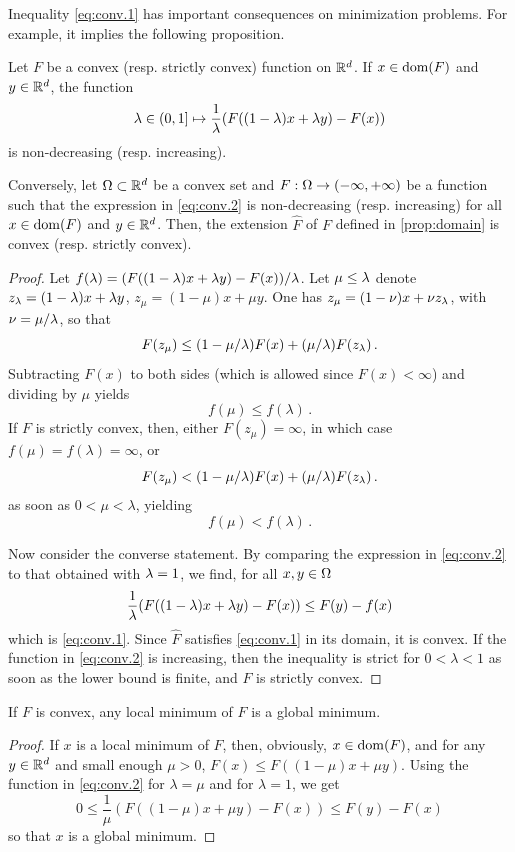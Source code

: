 Inequality \eqref{eq:conv.1} has important consequences on minimization problems. For example, it implies the following proposition.
\begin{proposition}
\label{prop:conv.2}
Let $F$ be a convex (resp. strictly convex)  function on ${\mathbb{R}}^d$.
If $x\in \mathrm{dom}(F)$ and $y\in{\mathbb{R}}^d$, the function
\begin{equation}
\label{eq:conv.2}
\lambda \in (0,1] \mapsto \frac1{\lambda} (F((1-\lambda)x + \lambda y) - F(x))
\end{equation}
is non-decreasing (resp. increasing). 

Conversely, let $\Omega\subset {\mathbb{R}}^d$ be a convex set and $F: \Omega \to (-\infty, +\infty)$ be a function such that the expression in \cref{eq:conv.2} is non-decreasing (resp. increasing) for all $x\in \mathrm{dom}(F)$ and $y\in{\mathbb{R}}^d$. Then, the extension $\hat F$ of $F$ defined in \cref{prop:domain} is convex (resp. strictly convex).
\end{proposition}
\begin{proof}
Let $f(\lambda) = (F((1-\lambda)x + \lambda y) - F(x))/\lambda$.
Let $\mu \leq \lambda$ denote $z_\lambda = (1-\lambda)x + \lambda y$, $z_\mu = (1-\mu)x + \mu y$. One has
$ z_\mu = (1-\nu) x + \nu z_\lambda$, with $\nu = \mu/\lambda$, so that
\[
F(z_\mu) \leq (1-\mu/\lambda) F(x) + (\mu/\lambda) F(z_\lambda)\,.
\]
Subtracting $F(x)$ to both sides (which is allowed since $F(x) <\infty$) and dividing by $\mu$ yields
\[
 f(\mu) \leq f(\lambda)\,.
\]
If $F$ is strictly convex, then, either $F(z_\mu) = \infty$, in which case $f(\mu) = f(\lambda) = \infty$, or
\[
F(z_\mu) < (1-\mu/\lambda) F(x) + (\mu/\lambda) F(z_\lambda)\,.
\]
as soon as $0 < \mu < \lambda$, yielding
\[
 f(\mu) < f(\lambda)\,.
\]

Now consider the converse statement. By comparing the expression in \eqref{eq:conv.2} to that obtained with $\lambda=1$, we find, for all $x,y\in\Omega$
\[
\frac1{\lambda} (F((1-\lambda)x + \lambda y) - F(x)) \leq F(y) - f(x)
\]
which is \cref{eq:conv.1}. Since $\hat F$ satisfies \cref{eq:conv.1} in its domain, it is convex. If the function in \cref{eq:conv.2} is increasing, then the inequality is strict for $0<\lambda < 1$ as soon as the lower bound is finite, and $F$ is strictly convex.
\end{proof}

\begin{corollary}
\label{corr:loc.min}
If $F$ is convex, any  local minimum of $F$ is  a global minimum.
\end{corollary}
\begin{proof}
If $x$ is a local minimum of $F$, then, obviously, $x\in \mathrm{dom}(F)$, and for any $y\in{\mathbb{R}}^d$ and small enough $\mu>0$, 
$F(x) \leq F((1-\mu)x + \mu y)$. Using the function in \cref{eq:conv.2} for $\lambda = \mu$ and for  $\lambda=1$, we get
\[
0 \leq \frac1\mu  (F((1-\mu)x + \mu y) - F(x)) \leq F(y) - F(x)
\]
so that $x$ is a global minimum.
\end{proof} 


